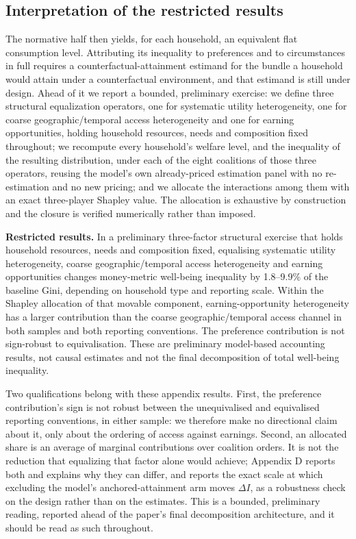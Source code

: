 \documentclass[11pt,a4paper]{article}
\begin{document}
\subsection{Interpretation of the restricted results}\label{interpretation-of-the-restricted-results}

The normative half then yields, for each household, an equivalent flat consumption level. Attributing its inequality to preferences and to circumstances in full requires a counterfactual-attainment estimand for the bundle a household would attain under a counterfactual environment, and that estimand is still under design. Ahead of it we report a bounded, preliminary exercise: we define three structural equalization operators, one for systematic utility heterogeneity, one for coarse geographic/temporal access heterogeneity and one for earning opportunities, holding household resources, needs and composition fixed throughout; we recompute every household's welfare level, and the inequality of the resulting distribution, under each of the eight coalitions of those three operators, reusing the model's own already-priced estimation panel with no re-estimation and no new pricing; and we allocate the interactions among them with an exact three-player Shapley value. The allocation is exhaustive by construction and the closure is verified numerically rather than imposed.

\textbf{Restricted results.} In a preliminary three-factor structural exercise that holds household resources, needs and composition fixed, equalising systematic utility heterogeneity, coarse geographic/temporal access heterogeneity and earning opportunities changes money-metric well-being inequality by 1.8--9.9\% of the baseline Gini, depending on household type and reporting scale. Within the Shapley allocation of that movable component, earning-opportunity heterogeneity has a larger contribution than the coarse geographic/temporal access channel in both samples and both reporting conventions. The preference contribution is not sign-robust to equivalisation. These are preliminary model-based accounting results, not causal estimates and not the final decomposition of total well-being inequality.

Two qualifications belong with these appendix results. First, the preference contribution's sign is not robust between the unequivalised and equivalised reporting conventions, in either sample: we therefore make no directional claim about it, only about the ordering of access against earnings. Second, an allocated share is an average of marginal contributions over coalition orders. It is not the reduction that equalizing that factor alone would achieve; Appendix D reports both and explains why they can differ, and reports the exact scale at which excluding the model's anchored-attainment arm moves \(\Delta I\), as a robustness check on the design rather than on the estimates. This is a bounded, preliminary reading, reported ahead of the paper's final decomposition architecture, and it should be read as such throughout.
\end{document}

